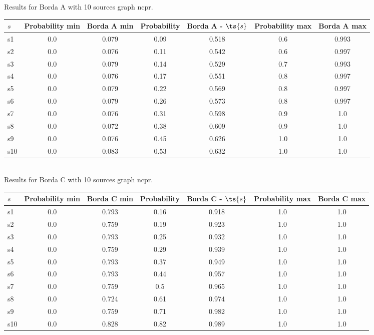 \documentclass{article}
\begin{document}
\noindent Results for Borda A with 10 sources graph ncpr.

\noindent\begin{tabular}{|l|c|c|c|c|c|c|}
\hline
$s$& Probability min & Borda A min & Probability & Borda A - $\ts{s}$ & Probability max & Borda A max\\
\hline
s1 &0.0 & 0.079 & 0.09 & 0.518 & 0.6 & 0.993\\
\hline
s2 &0.0 & 0.076 & 0.11 & 0.542 & 0.6 & 0.997\\
\hline
s3 &0.0 & 0.079 & 0.14 & 0.529 & 0.7 & 0.993\\
\hline
s4 &0.0 & 0.076 & 0.17 & 0.551 & 0.8 & 0.997\\
\hline
s5 &0.0 & 0.079 & 0.22 & 0.569 & 0.8 & 0.997\\
\hline
s6 &0.0 & 0.079 & 0.26 & 0.573 & 0.8 & 0.997\\
\hline
s7 &0.0 & 0.076 & 0.31 & 0.598 & 0.9 & 1.0\\
\hline
s8 &0.0 & 0.072 & 0.38 & 0.609 & 0.9 & 1.0\\
\hline
s9 &0.0 & 0.076 & 0.45 & 0.626 & 1.0 & 1.0\\
\hline
s10 &0.0 & 0.083 & 0.53 & 0.632 & 1.0 & 1.0\\
\hline
\end{tabular}\\

\noindent Results for Borda C with 10 sources graph ncpr.

\noindent\begin{tabular}{|l|c|c|c|c|c|c|}
\hline
$s$& Probability min & Borda C min & Probability & Borda C - $\ts{s}$ & Probability max & Borda C max\\
\hline
s1 &0.0 & 0.793 & 0.16 & 0.918 & 1.0 & 1.0\\
\hline
s2 &0.0 & 0.759 & 0.19 & 0.923 & 1.0 & 1.0\\
\hline
s3 &0.0 & 0.793 & 0.25 & 0.932 & 1.0 & 1.0\\
\hline
s4 &0.0 & 0.759 & 0.29 & 0.939 & 1.0 & 1.0\\
\hline
s5 &0.0 & 0.793 & 0.37 & 0.949 & 1.0 & 1.0\\
\hline
s6 &0.0 & 0.793 & 0.44 & 0.957 & 1.0 & 1.0\\
\hline
s7 &0.0 & 0.759 & 0.5 & 0.965 & 1.0 & 1.0\\
\hline
s8 &0.0 & 0.724 & 0.61 & 0.974 & 1.0 & 1.0\\
\hline
s9 &0.0 & 0.759 & 0.71 & 0.982 & 1.0 & 1.0\\
\hline
s10 &0.0 & 0.828 & 0.82 & 0.989 & 1.0 & 1.0\\
\hline
\end{tabular}\\
\end{document}
